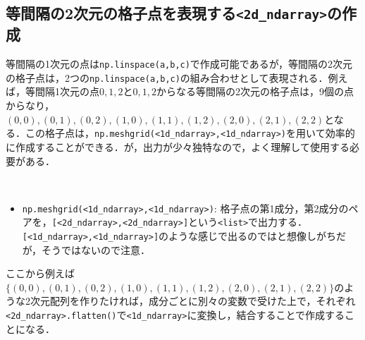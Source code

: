 \begin{cod}[\texttt{num9.py}]　
}]{code/num9.py}
\vspace{-10pt}
\begin{lstlisting}
matrix=
[[ 1 -1]
 [ 2 -2]
 [ 3 -3]
 [ 4 -4]],
shape=(4, 2)
\end{lstlisting}
\end{cod}
\vspace{-10pt}


\subsection{等間隔の2次元の格子点を表現する\texttt{<2d\_ndarray>}の作成}

等間隔の1次元の点は\texttt{np.linspace(a,b,c)}で作成可能であるが，等間隔の2次元の格子点は，2つの\texttt{np.linspace(a,b,c)}の組み合わせとして表現される．例えば，等間隔1次元の点$0,1,2$と$0,1,2$からなる等間隔の2次元の格子点は，9個の点からなり，$(0,0),(0,1),(0,2),(1,0),(1,1),(1,2),(2,0),(2,1),(2,2)$となる．この格子点は，\texttt{np.meshgrid(<1d\_ndarray>,<1d\_ndarray>)}を用いて効率的に作成することができる．が，出力が少々独特なので，よく理解して使用する必要がある．

\begin{gram}　
\begin{itemize}
\item \texttt{np.meshgrid(<1d\_ndarray>,<1d\_ndarray>)}: 格子点の第1成分，第2成分のペアを，\texttt{[<2d\_ndarray>,<2d\_ndarray>]}という\texttt{<list>}で出力する．\texttt{[<1d\_ndarray>,<1d\_ndarray>]}のような感じで出るのではと想像しがちだが，そうではないので注意．
\end{itemize}
\end{gram}

ここから例えば$\{(0,0),(0,1),(0,2),(1,0),(1,1),(1,2),(2,0),(2,1),(2,2)\}$のような2次元配列を作りたければ，成分ごとに別々の変数で受けた上で，それぞれ\texttt{<2d\_ndarray>.flatten()}で\texttt{<1d\_ndarray>}に変換し，結合することで作成することになる．

\begin{cod}[\texttt{num10.py}]　
}]{code/num10.py}
\vspace{-10pt}
\begin{lstlisting}
grid=
[array([[0, 1, 2],
       [0, 1, 2],
       [0, 1, 2]]), array([[0, 0, 0],
       [1, 1, 1],
       [2, 2, 2]])]
type=<class 'list'>
grid=
[[0 0]
 [1 0]
 [2 0]
 [0 1]
 [1 1]
 [2 1]
 [0 2]
 [1 2]
 [2 2]]
type=<class 'numpy.ndarray'>
\end{lstlisting}
\end{cod}
\vspace{-10pt}


